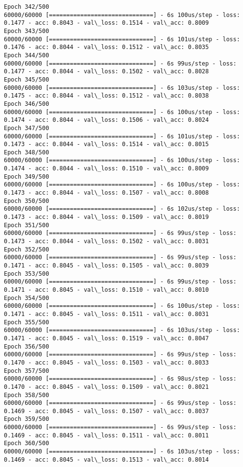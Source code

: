 \documentclass[11pt]{article}
\begin{document}
\begin{Verbatim}[commandchars=\\\{\}]
Epoch 342/500
60000/60000 [==============================] - 6s 100us/step - loss: 0.1477 - acc: 0.8043 - val\_loss: 0.1514 - val\_acc: 0.8009
Epoch 343/500
60000/60000 [==============================] - 6s 101us/step - loss: 0.1476 - acc: 0.8044 - val\_loss: 0.1512 - val\_acc: 0.8035
Epoch 344/500
60000/60000 [==============================] - 6s 99us/step - loss: 0.1477 - acc: 0.8044 - val\_loss: 0.1502 - val\_acc: 0.8028
Epoch 345/500
60000/60000 [==============================] - 6s 103us/step - loss: 0.1475 - acc: 0.8044 - val\_loss: 0.1512 - val\_acc: 0.8038
Epoch 346/500
60000/60000 [==============================] - 6s 100us/step - loss: 0.1474 - acc: 0.8044 - val\_loss: 0.1506 - val\_acc: 0.8024
Epoch 347/500
60000/60000 [==============================] - 6s 101us/step - loss: 0.1473 - acc: 0.8044 - val\_loss: 0.1514 - val\_acc: 0.8015
Epoch 348/500
60000/60000 [==============================] - 6s 100us/step - loss: 0.1474 - acc: 0.8044 - val\_loss: 0.1510 - val\_acc: 0.8009
Epoch 349/500
60000/60000 [==============================] - 6s 100us/step - loss: 0.1473 - acc: 0.8044 - val\_loss: 0.1507 - val\_acc: 0.8008
Epoch 350/500
60000/60000 [==============================] - 6s 102us/step - loss: 0.1473 - acc: 0.8044 - val\_loss: 0.1509 - val\_acc: 0.8019
Epoch 351/500
60000/60000 [==============================] - 6s 99us/step - loss: 0.1473 - acc: 0.8044 - val\_loss: 0.1502 - val\_acc: 0.8031
Epoch 352/500
60000/60000 [==============================] - 6s 99us/step - loss: 0.1471 - acc: 0.8045 - val\_loss: 0.1505 - val\_acc: 0.8039
Epoch 353/500
60000/60000 [==============================] - 6s 99us/step - loss: 0.1471 - acc: 0.8045 - val\_loss: 0.1510 - val\_acc: 0.8010
Epoch 354/500
60000/60000 [==============================] - 6s 100us/step - loss: 0.1471 - acc: 0.8045 - val\_loss: 0.1511 - val\_acc: 0.8031
Epoch 355/500
60000/60000 [==============================] - 6s 103us/step - loss: 0.1471 - acc: 0.8045 - val\_loss: 0.1519 - val\_acc: 0.8047
Epoch 356/500
60000/60000 [==============================] - 6s 99us/step - loss: 0.1470 - acc: 0.8045 - val\_loss: 0.1503 - val\_acc: 0.8033
Epoch 357/500
60000/60000 [==============================] - 6s 98us/step - loss: 0.1470 - acc: 0.8045 - val\_loss: 0.1509 - val\_acc: 0.8021
Epoch 358/500
60000/60000 [==============================] - 6s 99us/step - loss: 0.1469 - acc: 0.8045 - val\_loss: 0.1507 - val\_acc: 0.8037
Epoch 359/500
60000/60000 [==============================] - 6s 99us/step - loss: 0.1469 - acc: 0.8045 - val\_loss: 0.1511 - val\_acc: 0.8011
Epoch 360/500
60000/60000 [==============================] - 6s 103us/step - loss: 0.1469 - acc: 0.8045 - val\_loss: 0.1513 - val\_acc: 0.8014

\end{Verbatim}
\end{document}
